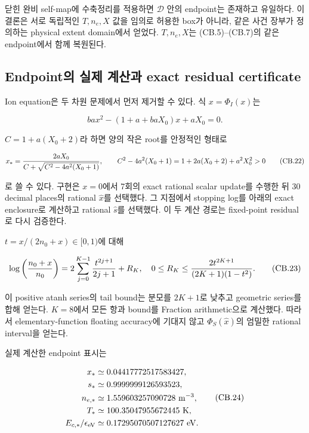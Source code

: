 \documentclass[11pt,a4paper]{article}
\begin{document}
닫힌 완비 self-map에 수축정리를 적용하면 \(\mathcal D\) 안의 endpoint는 존재하고 유일하다. 이 결론은 서로 독립적인 \(T,n_e,X\) 값을 임의로 허용한 box가 아니라, 같은 사건 장부가 정의하는 physical extent domain에서 얻었다. \(T,n_e,X\)는 (CB.5)--(CB.7)의 같은 endpoint에서 함께 복원된다.

\hypertarget{endpointuxc758-uxc2e4uxc81c-uxacc4uxc0b0uxacfc-exact-residual-certificate}{%
\subsection{Endpoint의 실제 계산과 exact residual certificate}\label{endpointuxc758-uxc2e4uxc81c-uxacc4uxc0b0uxacfc-exact-residual-certificate}}

Ion equation은 두 차원 문제에서 먼저 제거할 수 있다. 식 \(x=\Phi_I(x)\)는

\[
 ba x^2-(1+a+baX_0)x+aX_0=0.
 \tag{CB.21}
\]

\(C=1+a(X_0+2)\)라 하면 양의 작은 root를 안정적인 형태로

\[
 x_*={2aX_0\over C+\sqrt{C^2-4a^2(X_0+1)}},\qquad
 C^2-4a^2(X_0+1)=1+2a(X_0+2)+a^2X_0^2>0
 \tag{CB.22}
\]

로 쓸 수 있다. 구현은 \(x=0\)에서 7회의 exact rational scalar update를 수행한 뒤 30 decimal places의 rational \(\widehat x\)를 선택했다. 그 지점에서 stopping log를 아래의 exact enclosure로 계산하고 rational \(\widehat s\)를 선택했다. 이 두 계산 경로는 fixed-point residual로 다시 검증한다.

\(t=x/(2n_0+x)\in[0,1)\)에 대해

\[
 \log\left({n_0+x\over n_0}\right)
 =2\sum_{j=0}^{K-1}{t^{2j+1}\over2j+1}+R_K,
 \quad
 0\le R_K\le{2t^{2K+1}\over(2K+1)(1-t^2)}.
 \tag{CB.23}
\]

이 positive atanh series의 tail bound는 분모를 \(2K+1\)로 낮추고 geometric series를 합해 얻는다. \(K=8\)에서 모든 항과 bound를 Fraction arithmetic으로 계산했다. 따라서 elementary-function floating accuracy에 기대지 않고 \(\Phi_S(\widehat x)\)의 엄밀한 rational interval을 얻는다.

실제 계산한 endpoint 표시는

\[
 \begin{aligned}
 x_*&\simeq0.04417772517583427,\\
 s_*&\simeq0.9999999126593523,\\
 n_{e,*}&\simeq1.559603257090728\ {\rm m^{-3}},\\
 T_*&\simeq100.35047955672445\ {\rm K},\\
 E_{c,*}/\epsilon_{\rm eV}&\simeq0.17295070507127627\ {\rm eV}.
 \end{aligned}\tag{CB.24}
\]
\end{document}
